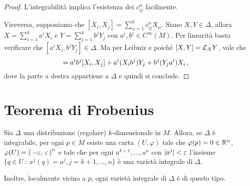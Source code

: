\begin{proof}
	L'integrabilità implica l'esistenza dei $c_{ij}^\alpha$ facilmente.
	
	Viceversa, supponiamo che $[X_i,X_j]=\sum_{\alpha=1}^kc_{ij}^\alpha X_\alpha$. Siano $X,Y\in\Delta$, allora $X=\sum_{i=1}^ka^iX_i$ e $Y=\sum_{j=1}^kb^jY_j$ con $a^i,b^j\in C^\infty(M)$. Per linearità basta verificare che $[a^iX_i,b^jY_j]\in\Delta$.
	Ma per Leibniz e poiché $[X,Y] = \mathcal L_XY$, vale che \begin{equation*}
		[a^iX_i,b^jY_j] = a^ib^j[X_i,X_j]+a^i(X_ib^j)Y_j+b^j(Y_ja^i)X_i\virgola %
	\end{equation*}
	dove la parte a destra appartiene a $\Delta$ e quindi si conclude.
\end{proof}

\section{Teorema di Frobenius}

\begin{theorem}[Frobenius] 
	Sia $\Delta$ una distribuzione (regolare) $k$-dimensionale in $M$. Allora, se $\Delta$ è integrabile, per ogni $p\in M$ esiste una carta $(U,\varphi)$ tale che
	$\varphi(p) = 0\in\mathbb R^n$, $\varphi(U)=\left(\,-\varepsilon,\,\varepsilon\,\right)^n$ e tale che per ogni $a^{k+1},\ldots,a^n$ con $\lvert a^j\rvert<\varepsilon$ l'insieme $\{q\in U\ : \ x^j(q)=a^j, j=k+1,\ldots,n\}$ è una varietà integrale di $\Delta$.
	
	Inoltre, localmente vicino a $p$, ogni varietà integrale di $\Delta$ è di questo tipo.
\end{theorem}

